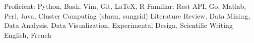 \begin{cvskills}
    	    {Proficient: Python, Bash, Vim, Git, LaTeX, R} %
	\cvskill{}
            {Familiar: Rest API, Go, Matlab, Perl, Java, Cluster Computing (slurm, sungrid)}
            {Literature Review, Data Mining, Data Analysis, Data Visualization, Experimental Design, Scientific Writing}
		    {English, French}
\end{cvskills}
